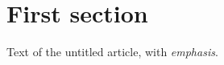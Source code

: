 \documentclass{revtex4}
\begin{document}
\section{First section}
Text of the untitled article, with \emph{emphasis}.
\end{document}
